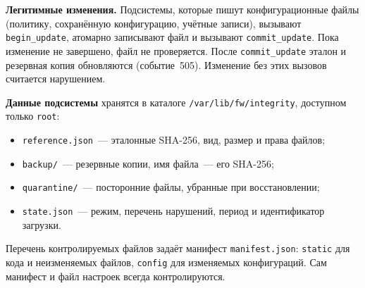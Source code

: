 \textbf{Легитимные изменения.} Подсистемы, которые пишут конфигурационные
файлы (политику, сохранённую конфигурацию, учётные записи), вызывают
\texttt{begin\_update}, атомарно записывают файл и вызывают
\texttt{commit\_update}. Пока изменение не завершено, файл не проверяется.
После \texttt{commit\_update} эталон и резервная копия обновляются
(событие~505). Изменение без этих вызовов считается нарушением.

\textbf{Данные подсистемы} хранятся в каталоге
\texttt{/var/lib/fw/integrity}, доступном только \texttt{root}:
\begin{itemize}
\item \texttt{reference.json}~— эталонные SHA-256, вид, размер и права файлов;
\item \texttt{backup/}~— резервные копии, имя файла~— его SHA-256;
\item \texttt{quarantine/}~— посторонние файлы, убранные при восстановлении;
\item \texttt{state.json}~— режим, перечень нарушений, период и
  идентификатор загрузки.
\end{itemize}
Перечень контролируемых файлов задаёт манифест \texttt{manifest.json}:
\texttt{static} для кода и неизменяемых файлов, \texttt{config} для
изменяемых конфигураций. Сам манифест и файл настроек всегда
контролируются.
